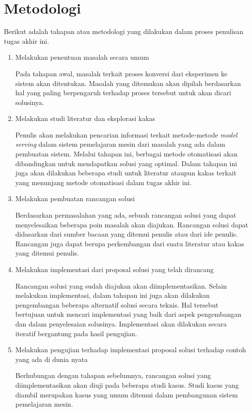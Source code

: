 \section{Metodologi}

Berikut adalah tahapan atau metodologi yang dilakukan dalam proses penulisan tugas akhir ini.

\begin{enumerate}
  \item Melakukan penentuan masalah secara umum
  
  Pada tahapan awal, masalah terkait proses konversi dari eksperimen ke sistem akan ditentukan.
  Masalah yang ditemukan akan dipilah berdasarkan hal yang paling berpengaruh terhadap proses tersebut untuk akan dicari solusinya.

  \item Melakukan studi literatur dan eksplorasi kakas
  
  Penulis akan melakukan pencarian informasi terkait metode-metode \textit{model serving} dalam sistem pemelajaran mesin dari masalah yang ada dalam pembuatan sistem.
  Melalui tahapan ini, berbagai metode otomatisasi akan dibandingkan untuk mendapatkan solusi yang optimal.
  Dalam tahapan ini juga akan dilakukan beberapa studi untuk literatur ataupun kakas terkait yang menunjang metode otomatisasi dalam tugas akhir ini.

  \item Melakukan pembuatan rancangan solusi
  
  Berdasarkan permasalahan yang ada, sebuah rancangan solusi yang dapat menyelesaikan beberapa poin masalah akan diajukan.
  Rancangan solusi dapat didasarkan dari sumber bacaan yang ditemui penulis atau dari ide penulis.
  Rancangan juga dapat berupa perkembangan dari suatu literatur atau kakas yang ditemui penulis.

  \item Melakukan implementasi dari proposal solusi yang telah dirancang
  
  Rancangan solusi yang sudah diajukan akan diimplementasikan.
  Selain melakukan implementasi, dalam tahapan ini juga akan dilakukan pengembangan beberapa alternatif solusi secara teknis.
  Hal tersebut bertujuan untuk mencari implementasi yang baik dari aspek pengembangan dan dalam penyelesaian solusinya.
  Implementasi akan dilakukan secara iteratif bergantung pada hasil pengujian.

  \item Melakukan pengujian terhadap implementasi proposal solusi terhadap contoh yang ada di dunia nyata
  
  Berhubungan dengan tahapan sebelumnya, rancangan solusi yang diimplementasikan akan diuji pada beberapa studi kasus.
  Studi kasus yang diambil merupakan kasus yang umum ditemui dalam pembangunan sistem pemelajaran mesin.
  
\end{enumerate}